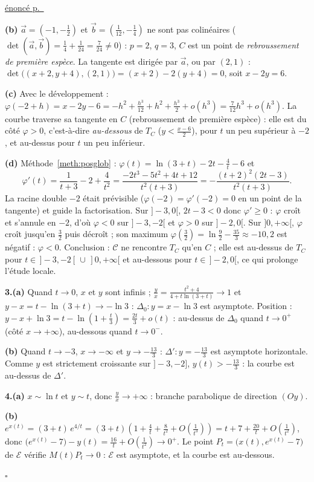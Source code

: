 \documentclass[a4paper,11pt]{article}
\numberwithin{equation}{section}
\numberwithin{figure}{section}
\numberwithin{table}{section}
\theoremstyle{enonce}
\theoremstyle{exemple}
\theoremstyle{remarque}
\newenvironment{corrige}[1]{%
  \par\needspace{6\baselineskip}\vspace{1em}\phantomsection\label{c:#1}%
  \noindent{\sffamily\bfseries\color{Bleu}Exercice~\ref{e:#1}}\quad
  {\scriptsize\sffamily\hyperref[e:#1]{\color{Gris}énoncé p.~\pageref{e:#1}}}\par\nobreak\vspace{0.2em}}%
  {\hfill\textcolor{BleuClair}{$\square$}\par}
\newcommand{\ve}[1]{\vec{#1}}
\begin{document}
\begin{corrige}{ds-pb}
\textbf{(b)} $\ve a=\left(-1,-\frac12\right)$ et $\ve b=\left(\frac1{12},-\frac14\right)$ ne sont pas colinéaires
($\det(\ve a,\ve b)=\frac14+\frac1{24}=\frac7{24}\neq0$) : $p=2$, $q=3$, $C$ est un point de \emph{rebroussement de première
espèce}. La tangente est dirigée par $\ve a$, ou par $(2,1)$ : $\det\big((x+2,y+4),(2,1)\big)=(x+2)-2(y+4)=0$, soit $x-2y=6$.

\textbf{(c)} Avec le développement : $\varphi(-2+h)=x-2y-6=-h^2+\frac{h^3}{12}+h^2+\frac{h^3}2+o(h^3)=\frac7{12}h^3+o(h^3)$.
La courbe traverse sa tangente en $C$ (rebroussement de première espèce) : elle est du côté $\varphi>0$, c'est-à-dire
\emph{au-dessous} de $T_C$ ($y<\frac{x-6}2$), pour $t$ un peu supérieur à $-2$, et au-dessus pour $t$ un peu inférieur.

\textbf{(d)} Méthode~\ref{meth:posglob} : $\varphi(t)=\ln(3+t)-2t-\frac4t-6$ et
\[\varphi'(t)=\frac1{t+3}-2+\frac4{t^2}=\frac{-2t^3-5t^2+4t+12}{t^2(t+3)}=-\frac{(t+2)^2(2t-3)}{t^2(t+3)}.\]
La racine double $-2$ était prévisible ($\varphi(-2)=\varphi'(-2)=0$ en un point de la tangente) et guide la factorisation.
Sur $]-3,0[$, $2t-3<0$ donc $\varphi'\geq0$ : $\varphi$ croît et s'annule en $-2$, d'où $\varphi<0$ sur $]-3,-2[$ et $\varphi>0$ sur
$]-2,0[$. Sur $]0,+\infty[$, $\varphi$ croît jusqu'en $\frac32$ puis décroît ; son maximum
$\varphi\left(\frac32\right)=\ln\frac92-\frac{35}3\approx-10{,}2$ est négatif : $\varphi<0$. Conclusion : $\mathcal C$ ne rencontre
$T_C$ qu'en $C$ ; elle est au-dessus de $T_C$ pour $t\in\,]-3,-2[\,\cup\,]0,+\infty[$ et au-dessous pour $t\in\,]-2,0[$, ce
qui prolonge l'étude locale.

\textbf{3.(a)} Quand $t\to0$, $x$ et $y$ sont infinis ; $\frac yx=\frac{t^2+4}{4+t\ln(3+t)}\to1$ et
$y-x=t-\ln(3+t)\to-\ln3$ : $\Delta_0:y=x-\ln3$ est asymptote. Position :
$y-x+\ln3=t-\ln\left(1+\frac t3\right)=\frac{2t}3+o(t)$ : au-dessus de $\Delta_0$ quand $t\to0^+$ (côté $x\to+\infty$),
au-dessous quand $t\to0^-$.

\textbf{(b)} Quand $t\to-3$, $x\to-\infty$ et $y\to-\frac{13}3$ : $\Delta':y=-\frac{13}3$ est asymptote horizontale. Comme $y$
est strictement croissante sur $]-3,-2]$, $y(t)>-\frac{13}3$ : la courbe est au-dessus de $\Delta'$.

\textbf{4.(a)} $x\sim\ln t$ et $y\sim t$, donc $\frac yx\to+\infty$ : branche parabolique de direction $(Oy)$.

\textbf{(b)} $e^{x(t)}=(3+t)\,e^{4/t}=(3+t)\left(1+\frac4t+\frac8{t^2}+O\!\left(\frac1{t^3}\right)\right)=t+7+\frac{20}t+O\!\left(\frac1{t^2}\right)$,
donc $\big(e^{x(t)}-7\big)-y(t)=\frac{16}t+O\!\left(\frac1{t^2}\right)\to0^+$. Le point $P_t=\big(x(t),e^{x(t)}-7\big)$ de
$\mathcal E$ vérifie $M(t)P_t\to0$ : $\mathcal E$ est asymptote, et la courbe est au-dessous.


\end{corrige}
\end{document}

